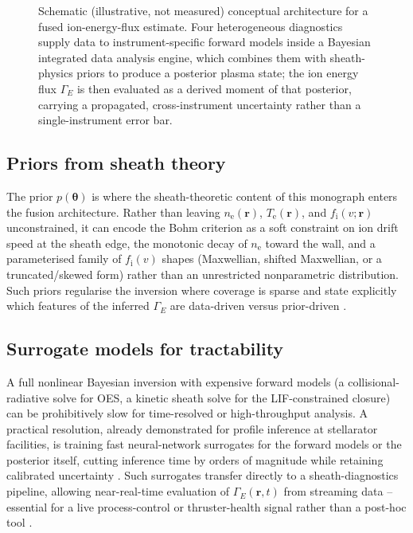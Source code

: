 \begin{figure}[htbp]
\caption{Schematic (illustrative, not measured) conceptual architecture for a fused ion-energy-flux estimate. Four heterogeneous diagnostics supply data to instrument-specific forward models inside a Bayesian integrated data analysis engine, which combines them with sheath-physics priors to produce a posterior plasma state; the ion energy flux $\Gamma_{E}$ is then evaluated as a derived moment of that posterior, carrying a propagated, cross-instrument uncertainty rather than a single-instrument error bar.}
\label{fig:fusion_architecture}
\end{figure}

\subsection{Priors from sheath theory}

The prior $p(\boldsymbol{\theta})$ is where the sheath-theoretic content of this monograph enters the fusion architecture. Rather than leaving $n_{\mathrm{e}}(\mathbf{r})$, $T_{\mathrm{e}}(\mathbf{r})$, and $f_{\mathrm{i}}(v; \mathbf{r})$ unconstrained, it can encode the Bohm criterion as a soft constraint on ion drift speed at the sheath edge, the monotonic decay of $n_{\mathrm{e}}$ toward the wall, and a parameterised family of $f_{\mathrm{i}}(v)$ shapes (Maxwellian, shifted Maxwellian, or a truncated/skewed form) rather than an unrestricted nonparametric distribution. Such priors regularise the inversion where coverage is sparse and state explicitly which features of the inferred $\Gamma_{E}$ are data-driven versus prior-driven \cite{ref0709}.

\subsection{Surrogate models for tractability}

A full nonlinear Bayesian inversion with expensive forward models (a collisional-radiative solve for OES, a kinetic sheath solve for the LIF-constrained closure) can be prohibitively slow for time-resolved or high-throughput analysis. A practical resolution, already demonstrated for profile inference at stellarator facilities, is training fast neural-network surrogates for the forward models or the posterior itself, cutting inference time by orders of magnitude while retaining calibrated uncertainty \cite{ref0728,ref0731}. Such surrogates transfer directly to a sheath-diagnostics pipeline, allowing near-real-time evaluation of $\Gamma_{E}(\mathbf{r}, t)$ from streaming data -- essential for a live process-control or thruster-health signal rather than a post-hoc tool \cite{ref0719}.


